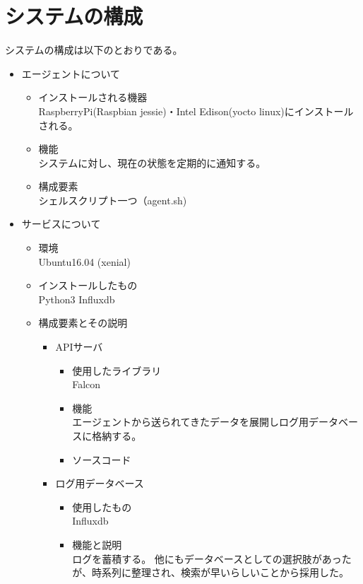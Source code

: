 \section{システムの構成}
システムの構成は以下のとおりである。
\begin{itemize}
	\item エージェントについて
		\begin{itemize}
			\item インストールされる機器\\
				RaspberryPi(Raspbian jessie)・Intel Edison(yocto linux)にインストールされる。
			\item 機能\\
				システムに対し、現在の状態を定期的に通知する。
			\item 構成要素\\
				シェルスクリプト一つ（agent.sh)
		\end{itemize}
	\item サービスについて
		\begin{itemize}
			\item 環境\\
				Ubuntu16.04 (xenial)
			\item インストールしたもの\\
				Python3 Influxdb
			\item 構成要素とその説明
				\begin{itemize}
					\item APIサーバ
						\begin{itemize}
							\item 使用したライブラリ\\
								Falcon
							\item 機能\\
								エージェントから送られてきたデータを展開しログ用データベースに格納する。
							\item ソースコード\\
						\end{itemize}
					\item ログ用データベース
						\begin{itemize}
							\item 使用したもの\\
								Influxdb
							\item 機能と説明\\
								ログを蓄積する。
								他にもデータベースとしての選択肢があったが、時系列に整理され、検索が早いらしいことから採用した。
						\end{itemize}

\end{itemize}
\end{itemize}
\end{itemize}
